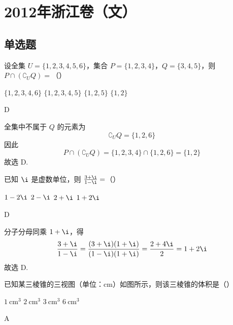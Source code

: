 \chapter{2012年浙江卷（文）}

\section{单选题}

\begin{problem}
设全集 \(U = \{1, 2, 3, 4, 5, 6\}\)，集合 \(P = \{1, 2, 3, 4\}\)，\(Q = \{3, 4, 5\}\)，则 \(P \cap (\complement_U Q) =\)（\quad）

\choices
    {\(\{1, 2, 3, 4, 6\}\)}
    {\(\{1,2,3,4,5\}\)}
    {\(\{1,2,5\}\)}
    {\(\{1,2\}\)}
\end{problem}

\begin{answer}
D
\end{answer}

\begin{solution}
全集中不属于 \(Q\) 的元素为
\[
\complement_U Q=\{1,2,6\}
\]
因此
\[
P\cap(\complement_U Q)=\{1,2,3,4\}\cap\{1,2,6\}=\{1,2\}
\]
故选 D.
\end{solution}


\begin{problem}
已知 \(\i\) 是虚数单位，则 \( \frac{3+\i}{1-\i}= \)（\quad）

\choices
    {\(1 - 2\i\)}
    {\(2 - \i\)}
    {\(2 + \i\)}
    {\(1 + 2\i\)}
\end{problem}

\begin{answer}
D
\end{answer}

\begin{solution}
分子分母同乘 \(1+\i\)，得
\[
\frac{3+\i}{1-\i}
=\frac{(3+\i)(1+\i)}{(1-\i)(1+\i)}
=\frac{2+4\i}{2}=1+2\i
\]
故选 D.
\end{solution}

\begin{problem}
已知某三棱锥的三视图（单位：\(\mathrm{cm}\)）如图所示，则该三棱锥的体积是（\quad）


\choices
    {\(1 \mathrm{~cm}^{3}\)}
    {\(2 \mathrm{~cm}^{3}\)}
    {\(3 \mathrm{~cm}^{3}\)}
    {\(6 \mathrm{~cm}^{3}\)}
\end{problem}

\begin{answer}
A
\end{answer}

